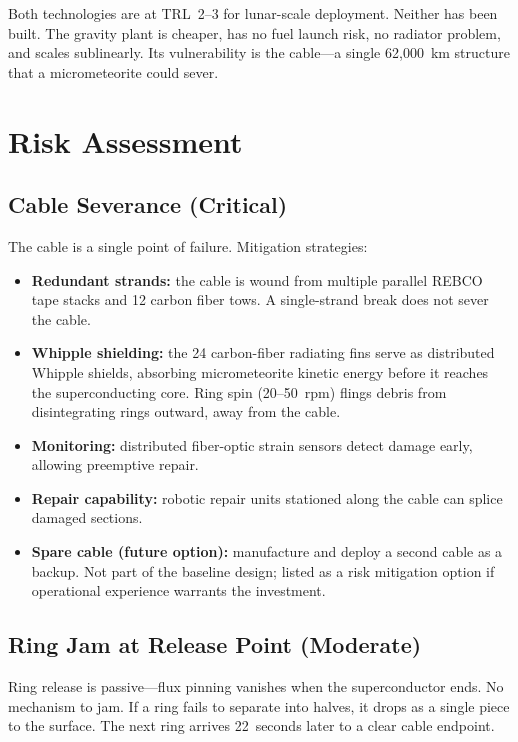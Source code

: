\documentclass[12pt,letterpaper]{article}
\begin{document}
Both technologies are at TRL~2--3 for lunar-scale deployment. Neither has been built. The gravity plant is cheaper, has no fuel launch risk, no radiator problem, and scales sublinearly. Its vulnerability is the cable---a single 62,000~km structure that a micrometeorite could sever.

\section{Risk Assessment}\label{sec:risk}

\subsection{Cable Severance (Critical)}

The cable is a single point of failure. Mitigation strategies:

\begin{itemize}
\item \textbf{Redundant strands:} the cable is wound from multiple parallel REBCO tape stacks and 12 carbon fiber tows. A single-strand break does not sever the cable.
\item \textbf{Whipple shielding:} the 24 carbon-fiber radiating fins serve as distributed Whipple shields, absorbing micrometeorite kinetic energy before it reaches the superconducting core. Ring spin (20--50~rpm) flings debris from disintegrating rings outward, away from the cable.
\item \textbf{Monitoring:} distributed fiber-optic strain sensors detect damage early, allowing preemptive repair.
\item \textbf{Repair capability:} robotic repair units stationed along the cable can splice damaged sections.
\item \textbf{Spare cable (future option):} manufacture and deploy a second cable as a backup. Not part of the baseline design; listed as a risk mitigation option if operational experience warrants the investment.
\end{itemize}

\subsection{Ring Jam at Release Point (Moderate)}

Ring release is passive---flux pinning vanishes when the superconductor ends. No mechanism to jam. If a ring fails to separate into halves, it drops as a single piece to the surface. The next ring arrives 22~seconds later to a clear cable endpoint.
\end{document}
